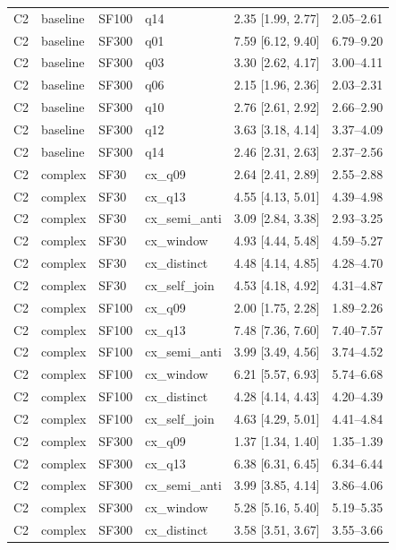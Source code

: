 \begin{longtable}{lllllr}
C2 & baseline & SF100 & q14 & 2.35 [1.99, 2.77] & 2.05--2.61 \\
C2 & baseline & SF300 & q01 & 7.59 [6.12, 9.40] & 6.79--9.20 \\
C2 & baseline & SF300 & q03 & 3.30 [2.62, 4.17] & 3.00--4.11 \\
C2 & baseline & SF300 & q06 & 2.15 [1.96, 2.36] & 2.03--2.31 \\
C2 & baseline & SF300 & q10 & 2.76 [2.61, 2.92] & 2.66--2.90 \\
C2 & baseline & SF300 & q12 & 3.63 [3.18, 4.14] & 3.37--4.09 \\
C2 & baseline & SF300 & q14 & 2.46 [2.31, 2.63] & 2.37--2.56 \\
C2 & complex & SF30 & cx\_q09 & 2.64 [2.41, 2.89] & 2.55--2.88 \\
C2 & complex & SF30 & cx\_q13 & 4.55 [4.13, 5.01] & 4.39--4.98 \\
C2 & complex & SF30 & cx\_semi\_anti & 3.09 [2.84, 3.38] & 2.93--3.25 \\
C2 & complex & SF30 & cx\_window & 4.93 [4.44, 5.48] & 4.59--5.27 \\
C2 & complex & SF30 & cx\_distinct & 4.48 [4.14, 4.85] & 4.28--4.70 \\
C2 & complex & SF30 & cx\_self\_join & 4.53 [4.18, 4.92] & 4.31--4.87 \\
C2 & complex & SF100 & cx\_q09 & 2.00 [1.75, 2.28] & 1.89--2.26 \\
C2 & complex & SF100 & cx\_q13 & 7.48 [7.36, 7.60] & 7.40--7.57 \\
C2 & complex & SF100 & cx\_semi\_anti & 3.99 [3.49, 4.56] & 3.74--4.52 \\
C2 & complex & SF100 & cx\_window & 6.21 [5.57, 6.93] & 5.74--6.68 \\
C2 & complex & SF100 & cx\_distinct & 4.28 [4.14, 4.43] & 4.20--4.39 \\
C2 & complex & SF100 & cx\_self\_join & 4.63 [4.29, 5.01] & 4.41--4.84 \\
C2 & complex & SF300 & cx\_q09 & 1.37 [1.34, 1.40] & 1.35--1.39 \\
C2 & complex & SF300 & cx\_q13 & 6.38 [6.31, 6.45] & 6.34--6.44 \\
C2 & complex & SF300 & cx\_semi\_anti & 3.99 [3.85, 4.14] & 3.86--4.06 \\
C2 & complex & SF300 & cx\_window & 5.28 [5.16, 5.40] & 5.19--5.35 \\
C2 & complex & SF300 & cx\_distinct & 3.58 [3.51, 3.67] & 3.55--3.66 \\

\end{longtable}
